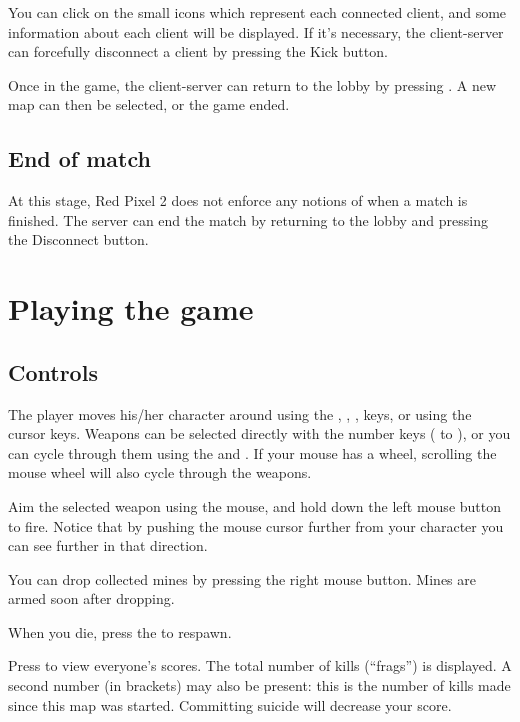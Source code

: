 \documentclass[a4paper]{article}
\begin{document}
You can click on the small icons which represent each connected
client, and some information about each client will be displayed.  If
it's necessary, the client-server can forcefully disconnect a client
by pressing the \textsf{Kick} button.

Once in the game, the client-server can return to the lobby by
pressing .  A new map can then be selected, or the game
ended.


\subsection{End of match}

At this stage, Red Pixel 2 does not enforce any notions of when a
match is finished.  The server can end the match by returning to the
lobby and pressing the \textsf{Disconnect} button.



\section{Playing the game}


\subsection{Controls}

The player moves his/her character around using the , ,
,  keys, or using the cursor keys.  Weapons can be
selected directly with the number keys ( to ), or you
can cycle through them using the  and .  If your mouse
has a wheel, scrolling the mouse wheel will also cycle through the
weapons.

Aim the selected weapon using the mouse, and hold down the left mouse
button to fire.  Notice that by pushing the mouse cursor further from
your character you can see further in that direction.

You can drop collected mines by pressing the right mouse button.
Mines are armed soon after dropping.

When you die, press the  to respawn.

Press  to view everyone's scores.  The total number of kills
(``frags'') is displayed.  A second number (in brackets) may also be
present: this is the number of kills made since this map was started.
Committing suicide will decrease your score.
\end{document}
